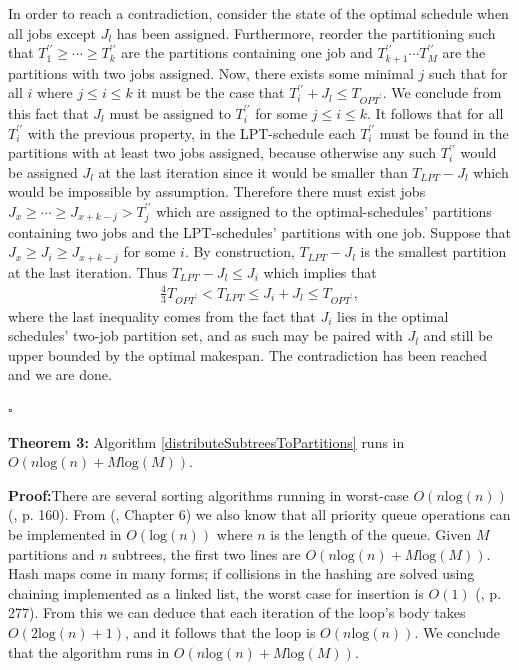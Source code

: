 \documentclass{report}
\begin{document}
In order to reach a contradiction, consider the state of the optimal schedule when all jobs except $J_l$ has been assigned. Furthermore, reorder the partitioning such that $T_1^{\prime \prime} \geq \cdots \geq T_k^{\prime \prime}$ are
the partitions containing one job and $T_{k+1}^{\prime \prime} \cdots T_M^{\prime \prime}$ are the partitions with two jobs assigned. Now, there exists some minimal $j$ 
such that for all $i$ where $j \leq i \leq k$ it must be the case that 
$T_i^{\prime \prime} + J_l \leq  T_{OPT^\prime}$. We conclude from this fact that $J_l$ must be assigned to $T_i^{\prime \prime}$ for some $j \leq i \leq k$.
It follows that for all $T_i^{\prime \prime}$ with the previous property, in the 
LPT-schedule each $T_i^{\prime \prime}$ must be found in the partitions with at least two jobs assigned, because otherwise any such $T_i^{\prime \prime}$ would be assigned $J_l$ at the last iteration since it would be smaller
than $T_{LPT} - J_l$ which would be impossible by assumption. Therefore there must exist jobs $J_{x} \geq \cdots \geq J_{x+k-j} > T_j^{\prime \prime}$ which are assigned to the optimal-schedules' partitions containing two jobs
and the LPT-schedules' partitions with one job. Suppose that $J_{x} \geq J_i \geq J_{x+k-j}$ for some $i$.
By construction, $T_{LPT} - J_l$ is the smallest partition at the last iteration. Thus $T_{LPT} - J_l \leq J_i$ which implies that 
\begin{align*}
	\frac{4}{3}T_{OPT^\prime} < T_{LPT} \leq J_i + J_l \leq T_{OPT^\prime},
\end{align*}
where the last inequality comes from the fact that $J_i$ lies in the optimal schedules' two-job partition set, and as such may be paired with $J_l$ and still be upper bounded by the optimal makespan.
The contradiction has been reached and we are done.

\hfill$\square$\newline

\noindent\textbf{Theorem 3:} Algorithm \ref{distributeSubtreesToPartitions} runs in $O(n\text{log}(n) + M\text{log}(M))$.\newline

\noindent\textbf{Proof:}\quad There are several sorting algorithms running in worst-case $O(n\text{log}(n))$ (\cite{clrs}, p. 160). 
From (\cite{clrs}, Chapter 6) we also know that all priority queue operations can be implemented in $O(\text{log}(n))$ where $n$
is the length of the queue. Given $M$ partitions and $n$ subtrees, the first two lines are $O(n\text{log}(n) + M\text{log}(M))$. Hash maps come in many forms; if collisions in the hashing are solved using 
chaining implemented as a linked list, the worst case for insertion is $O(1)$ (\cite{clrs}, p. 277). From this we can deduce that each iteration of the loop's body takes $O(2\text{log}(n) + 1)$, and it follows that the loop is 
$O(n\text{log}(n))$. We conclude that the algorithm runs in $O(n\text{log}(n) + M\text{log}(M))$.
\end{document}
